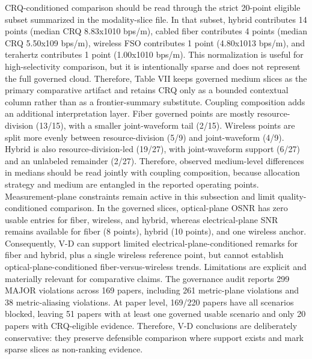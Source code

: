 {}CRQ-conditioned comparison should be read through the strict 20-point eligible subset summarized in the modality-slice file. In that subset, hybrid contributes 14 points (median CRQ 8.83x10\markdownRendererCircumflex{}10 bps/m), cabled fiber contributes 4 points (median CRQ 5.50x10\markdownRendererCircumflex{}9 bps/m), wireless FSO contributes 1 point (4.80x10\markdownRendererCircumflex{}13 bps/m), and terahertz contributes 1 point (1.00x10\markdownRendererCircumflex{}10 bps/m). This normalization is useful for high-selectivity comparison, but it is intentionally sparse and does not represent the full governed cloud. Therefore, Table VII keeps governed medium slices as the primary comparative artifact and retains CRQ only as a bounded contextual column rather than as a frontier-summary substitute.\markdownRendererParagraphSeparator
{}Coupling composition adds an additional interpretation layer. Fiber governed points are mostly resource-division (13/15), with a smaller joint-waveform tail (2/15). Wireless points are split more evenly between resource-division (5/9) and joint-waveform (4/9). Hybrid is also resource-division-led (19/27), with joint-waveform support (6/27) and an unlabeled remainder (2/27). Therefore, observed medium-level differences in medians should be read jointly with coupling composition, because allocation strategy and medium are entangled in the reported operating points.\markdownRendererParagraphSeparator
{}Measurement-plane constraints remain active in this subsection and limit quality-conditioned comparison. In the governed slices, optical-plane OSNR has zero usable entries for fiber, wireless, and hybrid, whereas electrical-plane SNR remains available for fiber (8 points), hybrid (10 points), and one wireless anchor. Consequently, V-D can support limited electrical-plane-conditioned remarks for fiber and hybrid, plus a single wireless reference point, but cannot establish optical-plane-conditioned fiber-versus-wireless trends.\markdownRendererParagraphSeparator
{}Limitations are explicit and materially relevant for comparative claims. The governance audit reports 299 MAJOR violations across 169 papers, including 261 metric-plane violations and 38 metric-aliasing violations. At paper level, 169/220 papers have all scenarios blocked, leaving 51 papers with at least one governed usable scenario and only 20 papers with CRQ-eligible evidence. Therefore, V-D conclusions are deliberately conservative: they preserve defensible comparison where support exists and mark sparse slices as non-ranking evidence.\markdownRendererParagraphSeparator
